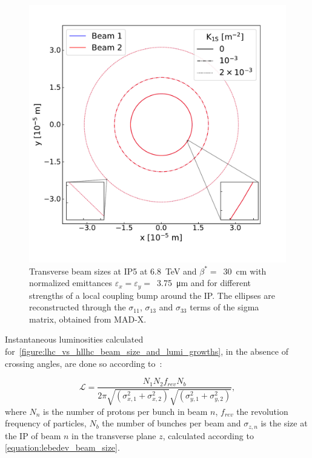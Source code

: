 \begin{figure}[!htb]
    \centering
    \includegraphics*[width=0.85\columnwidth]{Figures/IR_Coupling_Correction/ellipses_various_coupling_bumps.pdf}
    \caption{Transverse beam sizes at IP\num{5} at \qty{6.8}{\tera\electronvolt} and \(\beta^{\ast}=\)~\qty{30}{\centi\meter} with normalized emittances \(\varepsilon_x = \varepsilon_y =\)~\qty{3.75}{\micro\meter} and for different strengths of a local coupling bump around the IP. The ellipses are reconstructed through the \(\sigma_{11}\), \(\sigma_{13}\) and \(\sigma_{33}\) terms of the sigma matrix, obtained from MAD-X.}
    \label{figure:ip_ellipses_from_coupling}
\end{figure}

Instantaneous luminosities calculated for~\cref{figure:lhc_vs_hllhc_beam_size_and_lumi_growths}, in the absence of crossing angles, are done so according to~\cite{CERN:Herr:Concept_Luminosity}:

\begin{equation}
    \mathcal{L} = \frac{N_1 N_2 f_{rev} N_b}{2 \pi \sqrt{\left( \sigma_{x, 1}^2 + \sigma_{x, 2}^2 \right)} \sqrt{\left( \sigma_{y, 1}^2 + \sigma_{y, 2}^2 \right)}} ,
    \label{equation:luminosity_double_beams}
\end{equation}
where \(N_{n}\) is the number of protons per bunch in beam \(n\), \(f_{rev}\) the revolution frequency of particles, \(N_b\) the number of bunches per beam and \(\sigma_{z, n}\) is the size at the IP of beam \(n\) in the transverse plane \(z\), calculated according to \cref{equation:lebedev_beam_size}.

